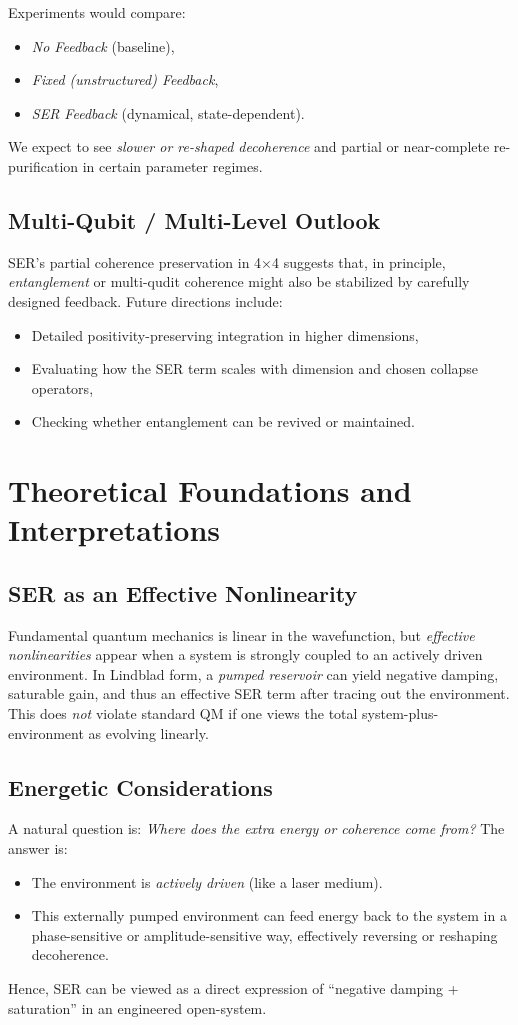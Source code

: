 \documentclass{article}
\begin{document}
Experiments would compare:
\begin{itemize}
\item \emph{No Feedback} (baseline),
\item \emph{Fixed (unstructured) Feedback},
\item \emph{SER Feedback} (dynamical, state-dependent).
\end{itemize}
We expect to see \emph{slower or re-shaped decoherence} and partial or near-complete re-purification in certain parameter regimes.

\subsection{Multi-Qubit / Multi-Level Outlook}
SER's partial coherence preservation in 4$\times$4 suggests that, in principle, \emph{entanglement} or multi-qudit coherence might also be stabilized by carefully designed feedback. Future directions include:
\begin{itemize}
\item Detailed positivity-preserving integration in higher dimensions,
\item Evaluating how the SER term scales with dimension and chosen collapse operators,
\item Checking whether entanglement can be revived or maintained.
\end{itemize}

\section{Theoretical Foundations and Interpretations}

\subsection{SER as an Effective Nonlinearity}
Fundamental quantum mechanics is linear in the wavefunction, but \emph{effective nonlinearities} appear when a system is strongly coupled to an actively driven environment. In Lindblad form, a \emph{pumped reservoir} can yield negative damping, saturable gain, and thus an effective SER term after tracing out the environment. This does \emph{not} violate standard QM if one views the total system-plus-environment as evolving linearly.

\subsection{Energetic Considerations}
A natural question is: \emph{Where does the extra energy or coherence come from?} The answer is:
\begin{itemize}
\item The environment is \emph{actively driven} (like a laser medium).
\item This externally pumped environment can feed energy back to the system in a phase-sensitive or amplitude-sensitive way, effectively reversing or reshaping decoherence.
\end{itemize}
Hence, SER can be viewed as a direct expression of ``negative damping + saturation'' in an engineered open-system.
\end{document}
